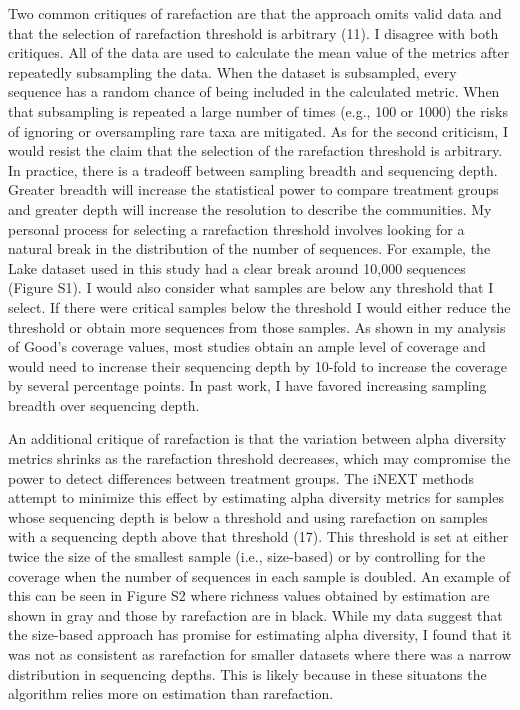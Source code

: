 \documentclass[
]{article}
\begin{document}
Two common critiques of rarefaction are that the approach omits valid
data and that the selection of rarefaction threshold is arbitrary (11).
I disagree with both critiques. All of the data are used to calculate
the mean value of the metrics after repeatedly subsampling the data.
When the dataset is subsampled, every sequence has a random chance of
being included in the calculated metric. When that subsampling is
repeated a large number of times (e.g., 100 or 1000) the risks of
ignoring or oversampling rare taxa are mitigated. As for the second
criticism, I would resist the claim that the selection of the
rarefaction threshold is arbitrary. In practice, there is a tradeoff
between sampling breadth and sequencing depth. Greater breadth will
increase the statistical power to compare treatment groups and greater
depth will increase the resolution to describe the communities. My
personal process for selecting a rarefaction threshold involves looking
for a natural break in the distribution of the number of sequences. For
example, the Lake dataset used in this study had a clear break around
10,000 sequences (Figure S1). I would also consider what samples are
below any threshold that I select. If there were critical samples below
the threshold I would either reduce the threshold or obtain more
sequences from those samples. As shown in my analysis of Good's coverage
values, most studies obtain an ample level of coverage and would need to
increase their sequencing depth by 10-fold to increase the coverage by
several percentage points. In past work, I have favored increasing
sampling breadth over sequencing depth.

An additional critique of rarefaction is that the variation between
alpha diversity metrics shrinks as the rarefaction threshold decreases,
which may compromise the power to detect differences between treatment
groups. The iNEXT methods attempt to minimize this effect by estimating
alpha diversity metrics for samples whose sequencing depth is below a
threshold and using rarefaction on samples with a sequencing depth above
that threshold (17). This threshold is set at either twice the size of
the smallest sample (i.e., size-based) or by controlling for the
coverage when the number of sequences in each sample is doubled. An
example of this can be seen in Figure S2 where richness values obtained
by estimation are shown in gray and those by rarefaction are in black.
While my data suggest that the size-based approach has promise for
estimating alpha diversity, I found that it was not as consistent as
rarefaction for smaller datasets where there was a narrow distribution
in sequencing depths. This is likely because in these situatons the
algorithm relies more on estimation than rarefaction.
\end{document}
